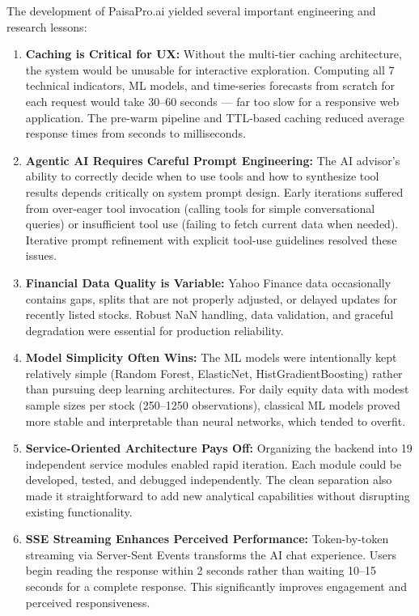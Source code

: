 \documentclass[12pt, a4paper, oneside]{report}
\newcommand{\projectname}{PaisaPro.ai}
\begin{document}
The development of \projectname{} yielded several important engineering and research lessons:

\begin{enumerate}
    \item \textbf{Caching is Critical for UX:} Without the multi-tier caching architecture, the system would be unusable for interactive exploration. Computing all 7 technical indicators, ML models, and time-series forecasts from scratch for each request would take 30--60 seconds --- far too slow for a responsive web application. The pre-warm pipeline and TTL-based caching reduced average response times from seconds to milliseconds.

    \item \textbf{Agentic AI Requires Careful Prompt Engineering:} The AI advisor's ability to correctly decide when to use tools and how to synthesize tool results depends critically on system prompt design. Early iterations suffered from over-eager tool invocation (calling tools for simple conversational queries) or insufficient tool use (failing to fetch current data when needed). Iterative prompt refinement with explicit tool-use guidelines resolved these issues.

    \item \textbf{Financial Data Quality is Variable:} Yahoo Finance data occasionally contains gaps, splits that are not properly adjusted, or delayed updates for recently listed stocks. Robust NaN handling, data validation, and graceful degradation were essential for production reliability.

    \item \textbf{Model Simplicity Often Wins:} The ML models were intentionally kept relatively simple (Random Forest, ElasticNet, HistGradientBoosting) rather than pursuing deep learning architectures. For daily equity data with modest sample sizes per stock (250--1250 observations), classical ML models proved more stable and interpretable than neural networks, which tended to overfit.

    \item \textbf{Service-Oriented Architecture Pays Off:} Organizing the backend into 19 independent service modules enabled rapid iteration. Each module could be developed, tested, and debugged independently. The clean separation also made it straightforward to add new analytical capabilities without disrupting existing functionality.

    \item \textbf{SSE Streaming Enhances Perceived Performance:} Token-by-token streaming via Server-Sent Events transforms the AI chat experience. Users begin reading the response within 2 seconds rather than waiting 10--15 seconds for a complete response. This significantly improves engagement and perceived responsiveness.
\end{enumerate}
\end{document}
